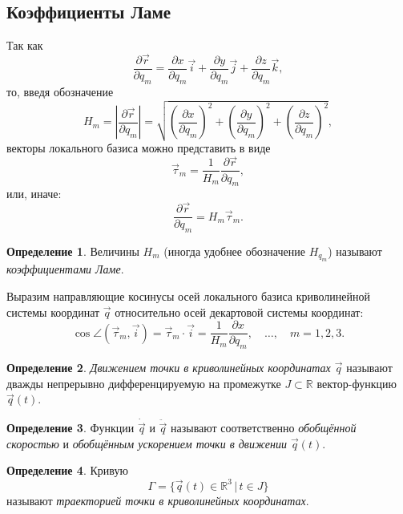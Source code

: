 \documentclass{article}
\theoremstyle{definition}
\newtheorem{definition}{Определение}[section]
\theoremstyle{plain}
\theoremstyle{remark}
\numberwithin{equation}{section}
\newcommand{\abs}[1]{\left|#1\right|}
\newcommand{\paren}[1]{\left( #1 \right)}
\newcommand{\dotprod}[2]{#1 \cdot #2}
\newcommand{\parder}[2][]{\frac{\partial #1}{\partial #2}}
\begin{document}
\subsection{Коэффициенты Ламе}

Так как
\begin{equation}
  \parder[\vec{r}]{q_m} = \parder[x]{q_m} \vec{i} + \parder[y]{q_m} \vec{j} +
  \parder[z]{q_m} \vec{k},
\end{equation}
то, введя обозначение
\begin{equation}
  H_m = \abs{\parder[\vec{r}]{q_m}} = \sqrt{\paren{\parder[x]{q_m}}^2 +
  \paren{\parder[y]{q_m}}^2 + \paren{\parder[z]{q_m}}^2},
\end{equation}
векторы локального базиса можно представить в виде
\begin{equation}
  \label{eq:local_basis_vec}
  \vec{\tau}_m = \frac{1}{H_m} \parder[\vec{r}]{q_m},
\end{equation}
или, иначе:
\begin{equation}
  \label{eq:local_basis_vec_alt}
  \parder[\vec{r}]{q_m} = H_m \vec{\tau}_m.
\end{equation}

\begin{definition}
  Величины $H_m$ (иногда удобнее обозначение $H_{q_m}$) называют
  \textit{коэффициентами Ламе}.
\end{definition}

Выразим направляющие косинусы осей локального базиса криволинейной системы
координат $\vec{q}$ относительно осей декартовой системы координат:
\begin{equation}
  \cos\angle (\vec{\tau}_m, \vec{i}) = \dotprod{\vec{\tau}_m}{\vec{i}} =
    \frac{1}{H_m} \parder[x]{q_m}, \quad \dots, \quad m = 1,2,3.
\end{equation}

\begin{definition}
  \textit{Движением точки в криволинейных координатах $\vec{q}$} называют
  дважды непрерывно дифференцируемую на промежутке $J \subset \mathbb{R}$
  вектор-функцию $\vec{q}(t)$.
\end{definition}

\begin{definition}
  Функции $\dot{\vec{q}}$ и $\ddot{\vec{q}}$ называют соответственно
  \textit{обобщённой скоростью} и \textit{обобщённым ускорением точки в
  движении $\vec{q}(t)$}.
\end{definition}

\begin{definition}
  Кривую
  \begin{equation*}
    \Gamma = \{ \vec{q}(t) \in \mathbb{R}^3 \, | \, t \in J \}
  \end{equation*}
  называют \textit{траекторией точки в криволинейных координатах}.
\end{definition}
\end{document}
